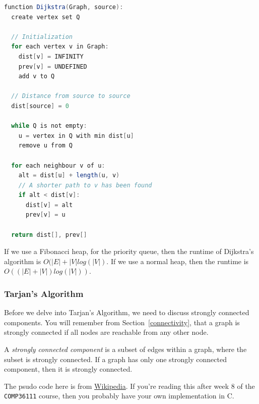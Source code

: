 
\begin{lstlisting}[language=java,
                  caption=Dijkstra's algorithm (from Wikipedia),
                  label=lst:dijkstra,
                  captionpos=b]
function Dijkstra(Graph, source):
  create vertex set Q

  // Initialization
  for each vertex v in Graph:
    dist[v] = INFINITY
    prev[v] = UNDEFINED
    add v to Q

  // Distance from source to source
  dist[source] = 0

  while Q is not empty:
    u = vertex in Q with min dist[u]
    remove u from Q 

  for each neighbour v of u:
    alt = dist[u] + length(u, v)
    // A shorter path to v has been found
    if alt < dist[v]:
      dist[v] = alt 
      prev[v] = u 

  return dist[], prev[]
\end{lstlisting}

If we use a Fibonacci heap, for the priority queue, then the runtime of
Dijkstra's algorithm is $O(|E| + |V|log(|V|)$. If we use a normal heap, then the
runtime is $O((|E|+|V|)log(|V|))$.

\subsubsection{Tarjan's Algorithm}

Before we delve into Tarjan's Algorithm, we need to discuss strongly connected
components. You will remember from Section~\ref{connectivity}, that a graph is
strongly connected if all nodes are reachable from any other node.

A \textit{strongly connected component} is a subset of edges within a graph,
where the subset is strongly connected. If a graph has only one strongly
connected component, then it is strongly connected.

The psudo code here is from
\href{https://en.wikipedia.org/wiki/Tarjan%27s_strongly_connected_components_algorithm}{Wikipedia}.
If you're reading this after week 8 of the \texttt{COMP36111} course, then you
probably have your own implementation in C.


